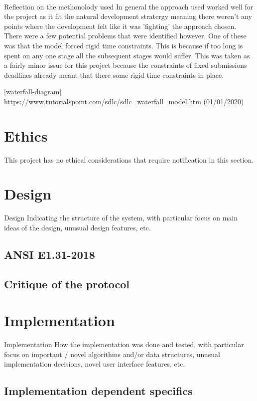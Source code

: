 \documentclass[11pt,a4paper,notitlepage]{report}
\begin{document}
	\paragraph*{}
	Reflection on the methonolody used
	In general the approach used worked well for the project as it fit the natural development stratergy meaning there weren't any points where the development felt
	like it was 'fighting' the approach chosen. There were a few potential problems that were identified however. One of these was that the model forced rigid time 
	constraints. This is because if too long is spent on any one stage all the subsequent stages would suffer. This was taken as a fairly minor issue for this project 
	because the constraints of fixed submissions deadlines already meant that there some rigid time constraints in place. 

	\ref{waterfall-diagram}
	https://www.tutorialspoint.com/sdlc/sdlc\_waterfall\_model.htm (01/01/2020)
	
	\section*{Ethics}
	This project has no ethical considerations that require notification in this section.
	
	\section{Design}
	Design
	Indicating the structure of the system, with particular
	focus on main ideas of the design, unusual design
	features, etc.
	\subsection{ANSI E1.31-2018}
	\subsection{Critique of the protocol}
	\section{Implementation}
	Implementation
	How the implementation was done and tested, with
	particular focus on important / novel algorithms
	and/or data structures, unusual implementation
	decisions, novel user interface features, etc.
	
	\subsection{Implementation dependent specifics}
	
\end{document}
